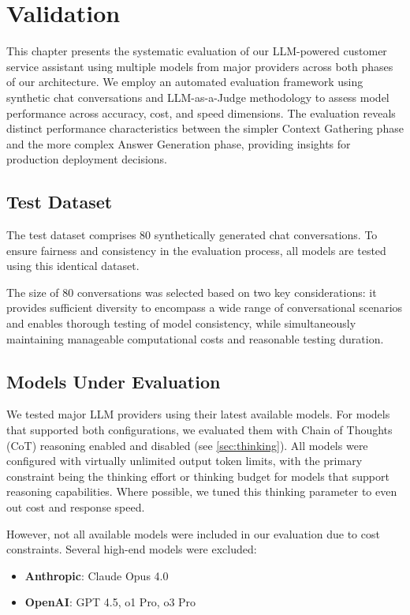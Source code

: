 \chapter{Validation}
\label{cha:validation}

This chapter presents the systematic evaluation of our LLM-powered customer service assistant using multiple models from major providers across both phases of our architecture.
We employ an automated evaluation framework using synthetic chat conversations and LLM-as-a-Judge methodology to assess model performance across accuracy, cost, and speed dimensions.
The evaluation reveals distinct performance characteristics between the simpler Context Gathering phase and the more complex Answer Generation phase, providing insights for production deployment decisions.

\section{Test Dataset}

The test dataset comprises 80 synthetically generated chat conversations.
To ensure fairness and consistency in the evaluation process, all models are tested using this identical dataset.

The size of 80 conversations was selected based on two key considerations: it provides sufficient diversity to encompass a wide range of conversational scenarios and enables thorough testing of model consistency, while simultaneously maintaining manageable computational costs and reasonable testing duration.

\section{Models Under Evaluation}

We tested major LLM providers using their latest available models.
For models that supported both configurations, we evaluated them with Chain of Thoughts (CoT) reasoning enabled and disabled (see \cref{sec:thinking}).
All models were configured with virtually unlimited output token limits, with the primary constraint being the thinking effort or thinking budget for models that support reasoning capabilities.
Where possible, we tuned this thinking parameter to even out cost and response speed.

However, not all available models were included in our evaluation due to cost constraints. Several high-end models were excluded:
\begin{itemize}
    \item \textbf{Anthropic}: Claude Opus 4.0 \cite{anthropic_pricing}
    \item \textbf{OpenAI}: GPT 4.5, o1 Pro, o3 Pro \cite{openai_pricing}
\end{itemize}

